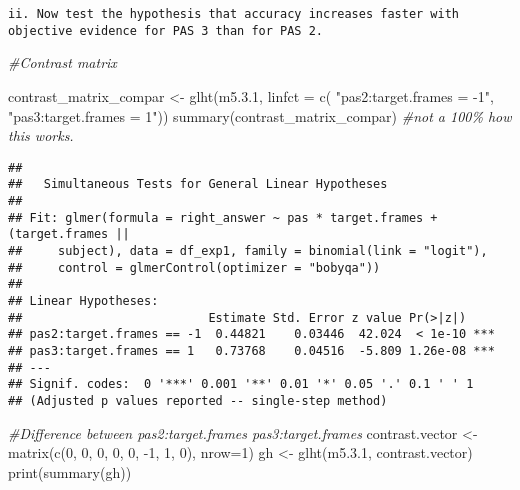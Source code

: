 \documentclass[
]{article}
\newenvironment{Shaded}{\begin{snugshade}}{\end{snugshade}}
\newcommand{\AttributeTok}[1]{\textcolor[rgb]{0.77,0.63,0.00}{#1}}
\newcommand{\CommentTok}[1]{\textcolor[rgb]{0.56,0.35,0.01}{\textit{#1}}}
\newcommand{\DecValTok}[1]{\textcolor[rgb]{0.00,0.00,0.81}{#1}}
\newcommand{\FloatTok}[1]{\textcolor[rgb]{0.00,0.00,0.81}{#1}}
\newcommand{\FunctionTok}[1]{\textcolor[rgb]{0.00,0.00,0.00}{#1}}
\newcommand{\NormalTok}[1]{#1}
\newcommand{\OtherTok}[1]{\textcolor[rgb]{0.56,0.35,0.01}{#1}}
\newcommand{\SpecialCharTok}[1]{\textcolor[rgb]{0.00,0.00,0.00}{#1}}
\newcommand{\StringTok}[1]{\textcolor[rgb]{0.31,0.60,0.02}{#1}}
\begin{document}
\begin{verbatim}
ii. Now test the hypothesis that accuracy increases faster with objective evidence for PAS 3 than for PAS 2.
\end{verbatim}

\begin{Shaded}
\begin{Highlighting}[]
\CommentTok{\#Contrast matrix}


\NormalTok{contrast\_matrix\_compar }\OtherTok{\textless{}{-}} \FunctionTok{glht}\NormalTok{(m5.}\FloatTok{3.1}\NormalTok{, }\AttributeTok{linfct =} \FunctionTok{c}\NormalTok{( }\StringTok{"pas2:target.frames = {-}1"}\NormalTok{, }\StringTok{"pas3:target.frames = 1"}\NormalTok{))}
\FunctionTok{summary}\NormalTok{(contrast\_matrix\_compar) }\CommentTok{\#not a 100\% how this works. }
\end{Highlighting}
\end{Shaded}

\begin{verbatim}
## 
##   Simultaneous Tests for General Linear Hypotheses
## 
## Fit: glmer(formula = right_answer ~ pas * target.frames + (target.frames || 
##     subject), data = df_exp1, family = binomial(link = "logit"), 
##     control = glmerControl(optimizer = "bobyqa"))
## 
## Linear Hypotheses:
##                          Estimate Std. Error z value Pr(>|z|)    
## pas2:target.frames == -1  0.44821    0.03446  42.024  < 1e-10 ***
## pas3:target.frames == 1   0.73768    0.04516  -5.809 1.26e-08 ***
## ---
## Signif. codes:  0 '***' 0.001 '**' 0.01 '*' 0.05 '.' 0.1 ' ' 1
## (Adjusted p values reported -- single-step method)
\end{verbatim}

\begin{Shaded}
\begin{Highlighting}[]
\CommentTok{\#Difference between pas2:target.frames pas3:target.frames}
\NormalTok{contrast.vector }\OtherTok{\textless{}{-}} \FunctionTok{matrix}\NormalTok{(}\FunctionTok{c}\NormalTok{(}\DecValTok{0}\NormalTok{, }\DecValTok{0}\NormalTok{, }\DecValTok{0}\NormalTok{, }\DecValTok{0}\NormalTok{, }\DecValTok{0}\NormalTok{, }\SpecialCharTok{{-}}\DecValTok{1}\NormalTok{, }\DecValTok{1}\NormalTok{, }\DecValTok{0}\NormalTok{), }\AttributeTok{nrow=}\DecValTok{1}\NormalTok{)}
\NormalTok{gh }\OtherTok{\textless{}{-}} \FunctionTok{glht}\NormalTok{(m5.}\FloatTok{3.1}\NormalTok{, contrast.vector)}
\FunctionTok{print}\NormalTok{(}\FunctionTok{summary}\NormalTok{(gh))}
\end{Highlighting}
\end{Shaded}
\end{document}
